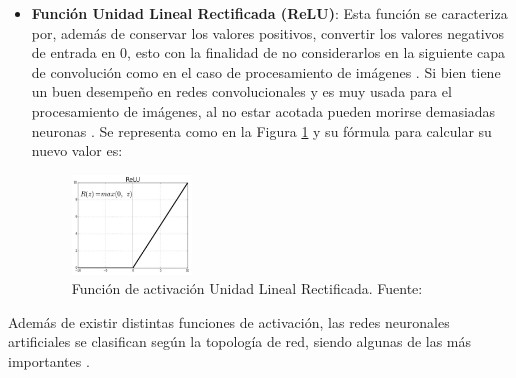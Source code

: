 \begin{itemize}
\begin{itemize}
	\item \textbf{Función Unidad Lineal Rectificada (ReLU)}: Esta función se caracteriza por, además de conservar los valores positivos, convertir los valores negativos de entrada en 0, esto con la finalidad de no considerarlos en la siguiente capa de convolución como en el caso de procesamiento de imágenes \parencite{gl_bigdata2019bigdata}. Si bien tiene un buen desempeño en redes convolucionales y es muy usada para el procesamiento de imágenes, al no estar acotada pueden morirse demasiadas neuronas \parencite{gl_calvo2018activrna}. Se representa como en la Figura \ref{2:fig20} y su fórmula para calcular su nuevo valor es:
	\begin{figure}[h]
		\begin{center}
			\includegraphics[width=0.3\textwidth]{2/figures/relu.jpg}
			\caption{Función de activación Unidad Lineal Rectificada. Fuente: \cite{gl_mlfa2019redesneuronales}}
			\label{2:fig20}
		\end{center}
	\end{figure}
	\end{itemize}
	
	Además de existir distintas funciones de activación, las redes neuronales artificiales se clasifican según la topología de red, siendo algunas de las más importantes \parencite{gl_calvo2017clasifrna}.
	

\end{itemize}
